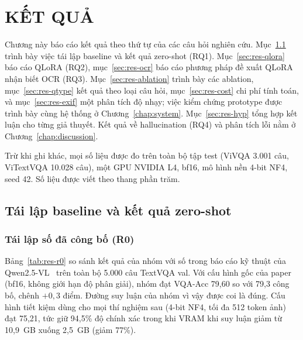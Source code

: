 
\chapter{KẾT QUẢ}
\label{chap:results}

\ifpdf
    \graphicspath{{Chapter6/Figs/Raster/}{Chapter6/Figs/PDF/}{Chapter6/Figs/}}
\else
    \graphicspath{{Chapter6/Figs/Vector/}{Chapter6/Figs/}}
\fi

Chương này báo cáo kết quả theo thứ tự của các câu hỏi nghiên cứu.
Mục~\ref{sec:res-repro} trình bày việc tái lập baseline và kết quả zero-shot
(RQ1). Mục~\ref{sec:res-qlora} báo cáo QLoRA (RQ2), mục~\ref{sec:res-ocr} báo cáo
phương pháp đề xuất QLoRA nhận biết OCR (RQ3). Mục~\ref{sec:res-ablation} trình
bày các ablation, mục~\ref{sec:res-qtype} kết quả theo loại câu hỏi,
mục~\ref{sec:res-cost} chi phí tính toán, và mục~\ref{sec:res-exif} một phân tích độ
nhạy; việc kiểm chứng prototype được trình bày cùng hệ thống ở Chương~\ref{chap:system}. Mục~\ref{sec:res-hyp} tổng
hợp kết luận cho từng giả thuyết. Kết quả về hallucination (RQ4) và phân tích lỗi
nằm ở Chương~\ref{chap:discussion}.

Trừ khi ghi khác, mọi số liệu được đo trên toàn bộ tập test (ViVQA 3.001 câu,
ViTextVQA 10.028 câu), một GPU NVIDIA L4, bf16, mô hình nền 4-bit NF4, seed 42.
Số liệu được viết theo thang phần trăm.

\section{Tái lập baseline và kết quả zero-shot}
\label{sec:res-repro}

\subsection{Tái lập số đã công bố (R0)}

Bảng~\ref{tab:res-r0} so sánh kết quả của nhóm với số trong báo cáo kỹ thuật của
Qwen2.5-VL~\cite{bai2025qwen25vl} trên toàn bộ 5.000 câu TextVQA val. Với cấu
hình gốc của paper (bf16, không giới hạn độ phân giải), nhóm đạt VQA-Acc 79,60 so
với 79,3 công bố, chênh $+0{,}3$ điểm. Đường suy luận của nhóm vì vậy được coi là
đúng. Cấu hình tiết kiệm dùng cho mọi thí nghiệm sau (4-bit NF4, tối đa 512 token
ảnh) đạt 75,21, tức giữ 94,5\% độ chính xác trong khi VRAM khi suy luận giảm từ
10,9~GB xuống 2,5~GB (giảm 77\%).

